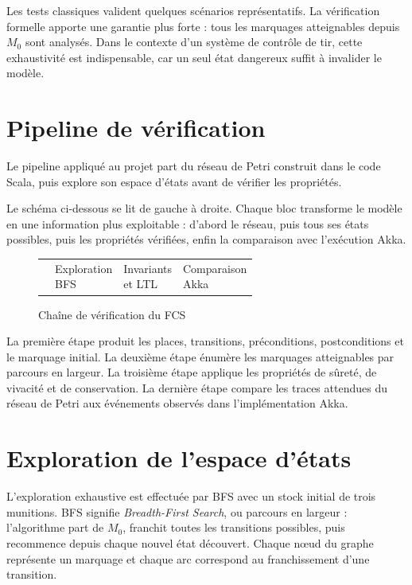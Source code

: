 \documentclass[11pt,a4paper]{report}
\begin{document}
Les tests classiques valident quelques scénarios représentatifs. La vérification formelle apporte une garantie plus forte : tous les marquages atteignables depuis $M_0$ sont analysés. Dans le contexte d'un système de contrôle de tir, cette exhaustivité est indispensable, car un seul état dangereux suffit à invalider le modèle.

\section{Pipeline de vérification}
Le pipeline appliqué au projet part du réseau de Petri construit dans le code Scala, puis explore son espace d'états avant de vérifier les propriétés.

Le schéma ci-dessous se lit de gauche à droite. Chaque bloc transforme le modèle en une information plus exploitable : d'abord le réseau, puis tous ses états possibles, puis les propriétés vérifiées, enfin la comparaison avec l'exécution Akka.

\begin{figure}[H]
\centering
\begin{tabularx}{0.96\textwidth}{>{\centering\arraybackslash}X>{\centering\arraybackslash}X>{\centering\arraybackslash}X>{\centering\arraybackslash}X}
\fbox{\parbox{0.18\textwidth}{\centering Construction\\du réseau}} &
\fbox{\parbox{0.18\textwidth}{\centering Exploration\\BFS}} &
\fbox{\parbox{0.18\textwidth}{\centering Invariants\\et LTL}} &
\fbox{\parbox{0.18\textwidth}{\centering Comparaison\\Akka}} \\
\end{tabularx}
\caption{Chaîne de vérification du FCS}
\label{fig:pipeline-verification}
\end{figure}

La première étape produit les places, transitions, préconditions, postconditions et le marquage initial. La deuxième étape énumère les marquages atteignables par parcours en largeur. La troisième étape applique les propriétés de sûreté, de vivacité et de conservation. La dernière étape compare les traces attendues du réseau de Petri aux événements observés dans l'implémentation Akka.

\section{Exploration de l'espace d'états}
L'exploration exhaustive est effectuée par BFS avec un stock initial de trois munitions. BFS signifie \emph{Breadth-First Search}, ou parcours en largeur : l'algorithme part de $M_0$, franchit toutes les transitions possibles, puis recommence depuis chaque nouvel état découvert. Chaque nœud du graphe représente un marquage et chaque arc correspond au franchissement d'une transition.
\end{document}
